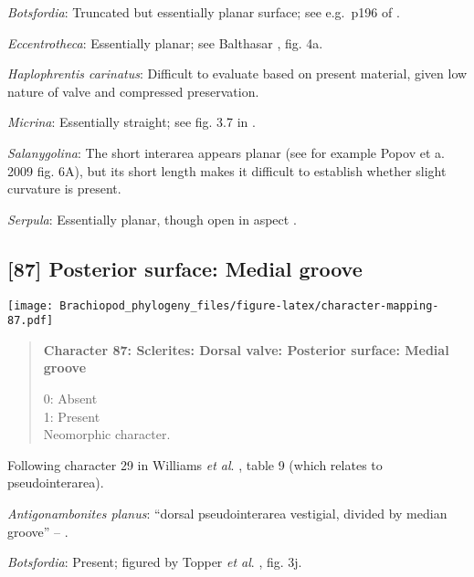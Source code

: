 \documentclass[openany]{book}
\theoremstyle{definition}
\theoremstyle{definition}
\theoremstyle{definition}
\theoremstyle{remark}
\begin{document}
\hypertarget{Botsfordia-coding-86}{}
\emph{Botsfordia}: Truncated but essentially planar surface; see
e.g.~p196 of \citet{Topper2013Reappraisalof}.

\hypertarget{Eccentrotheca-coding-86}{}
\emph{Eccentrotheca}: Essentially planar; see Balthasar
\citeyearpar{Balthasar2009Thebrachiopod}, fig. 4a.

\hypertarget{Haplophrentis_carinatus-coding-86}{}
\emph{Haplophrentis carinatus}: Difficult to evaluate based on present
material, given low nature of valve and compressed preservation.

\hypertarget{Micrina-coding-86}{}
\emph{Micrina}: Essentially straight; see fig. 3.7 in
\citet{Ushatinskaya2016Protegulumand}.

\hypertarget{Salanygolina-coding-86}{}
\emph{Salanygolina}: The short interarea appears planar (see for example
Popov et a. 2009 fig. 6A), but its short length makes it difficult to
establish whether slight curvature is present.

\hypertarget{Serpula-coding-86}{}
\emph{Serpula}: Essentially planar, though open in aspect
\citep[following Chiton in][]{Schwabe2010}.

\subsection*{{[}87{]} Posterior surface: Medial
groove}\label{posterior-surface-medial-groove}

\texttt{[image: Brachiopod\_phylogeny\_files/figure-latex/character-mapping-87.pdf]}

\begin{quote}
\textbf{Character 87: Sclerites: Dorsal valve: Posterior surface: Medial
groove}

0: Absent\\
1: Present\\
Neomorphic character.
\end{quote}

Following character 29 in Williams \emph{et al}.
\citeyearpar{Williams2000LinguliformeaCraniiformea}, table 9 (which
relates to pseudointerarea).

\hypertarget{Antigonambonites_planus-coding-87}{}
\emph{Antigonambonites planus}: ``dorsal pseudointerarea vestigial,
divided by median groove'' --
\citet{Williams2000LinguliformeaCraniiformea}.

\hypertarget{Botsfordia-coding-87}{}
\emph{Botsfordia}: Present; figured by Topper \emph{et al}.
\citeyearpar{Topper2013Reappraisalof}, fig. 3j.
\end{document}
